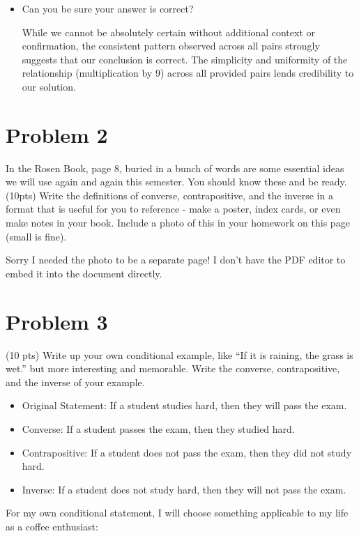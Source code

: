 \documentclass{article}
\begin{document}
\begin{itemize}
    \item Can you be sure your answer is correct?
    
    While we cannot be absolutely certain without additional context or confirmation, the consistent pattern observed across all pairs strongly suggests that our conclusion is correct. The simplicity and uniformity of the relationship (multiplication by 9) across all provided pairs lends credibility to our solution.
\end{itemize}

\clearpage

\section{Problem 2}

In the Rosen Book, page 8, buried in a bunch of words are some essential ideas we will
use again and again this semester. You should know these and be ready.
(10pts) Write the definitions of converse, contrapositive, and the inverse in a format that
is useful for you to reference - make a poster, index cards, or even make notes in your
book. Include a photo of this in your homework on this page (small is fine).

\bigskip
Sorry I needed the photo to be a separate page! I don't have the PDF editor to embed it into the document directly.

\clearpage

\section{Problem 3}

(10 pts) Write up your own conditional example, like “If it is raining, the grass is wet.” but
more interesting and memorable. Write the converse, contrapositive, and the inverse of
your example.

\begin{itemize}
    \item Original Statement: If a student studies hard, then they will pass the exam.
    \item Converse: If a student passes the exam, then they studied hard.
    \item Contrapositive: If a student does not pass the exam, then they did not study hard.
    \item Inverse: If a student does not study hard, then they will not pass the exam.
\end{itemize}
\bigskip
For my own conditional statement, I will choose something applicable to my life as a coffee enthusiast:
\end{document}
